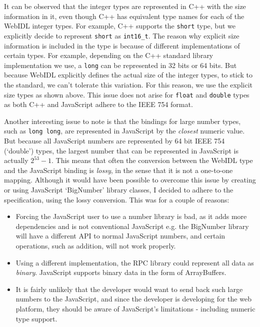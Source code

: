 It can be observed that the integer types are represented in C++ with the size information in it, even though C++ has equivalent type names for each of the WebIDL integer types. For example, C++ supports the \lstinline{short} type, but we explicitly decide to represent \lstinline{short} as \lstinline{int16_t}. The reason why explicit size information is included in the type is because of different implementations of certain types. For example, depending on the C++ standard library implementation we use, a \lstinline{long} can be represented in 32 bits or 64 bits. But because WebIDL explicitly defines the actual size of the integer types, to stick to the standard, we can't tolerate this variation. For this reason, we use the explicit size types as shown above. This issue does not arise for \lstinline{float} and \lstinline{double} types as both C++ and JavaScript adhere to the IEEE 754 format.

Another interesting issue to note is that the bindings for large number types, such as \lstinline{long long}, are represented in JavaScript by the \emph{closest} numeric value. But because all JavaScript numbers are represented by 64 bit IEEE 754 (`double') types, the largest number that can be represented in JavaScript is actually $2^{53}-1$. This means that often the conversion between the WebIDL type and the JavaScript binding is \emph{lossy}, in the sense that it is not a one-to-one mapping. Although it would have been possible to overcome this issue by creating or using JavaScript `BigNumber' library classes, I decided to adhere to the specification, using the lossy conversion. This was for a couple of reasons:

\begin{itemize}
	\item Forcing the JavaScript user to use a number library is bad, as it adds more dependencies and is not conventional JavaScript e.g. the BigNumber library will have a different API to normal JavaScript numbers, and certain operations, such as addition, will not work properly.
	\item Using a different implementation, the RPC library could represent all data as \emph{binary}. JavaScript supports binary data in the form of ArrayBuffers.
	\item It is fairly unlikely that the developer would want to send back such large numbers to the JavaScript, and since the developer is developing for the web platform, they should be aware of JavaScript's limitations - including numeric type support.
\end{itemize}

